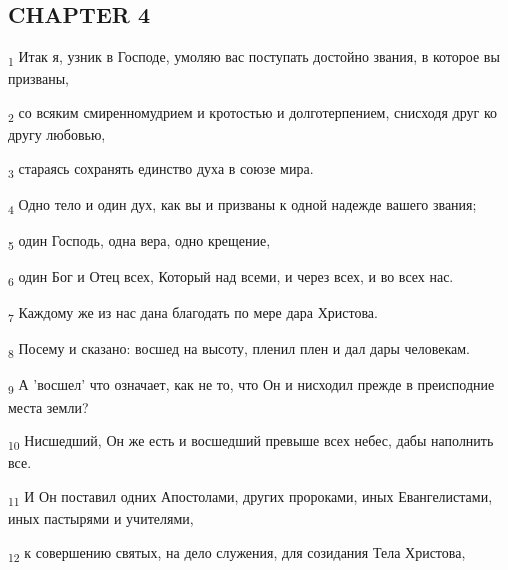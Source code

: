 \subsection{CHAPTER 4}
\begin{tcolorbox}
\textsubscript{1} Итак я, узник в Господе, умоляю вас поступать достойно звания, в которое вы призваны,
\end{tcolorbox}
\begin{tcolorbox}
\textsubscript{2} со всяким смиренномудрием и кротостью и долготерпением, снисходя друг ко другу любовью,
\end{tcolorbox}
\begin{tcolorbox}
\textsubscript{3} стараясь сохранять единство духа в союзе мира.
\end{tcolorbox}
\begin{tcolorbox}
\textsubscript{4} Одно тело и один дух, как вы и призваны к одной надежде вашего звания;
\end{tcolorbox}
\begin{tcolorbox}
\textsubscript{5} один Господь, одна вера, одно крещение,
\end{tcolorbox}
\begin{tcolorbox}
\textsubscript{6} один Бог и Отец всех, Который над всеми, и через всех, и во всех нас.
\end{tcolorbox}
\begin{tcolorbox}
\textsubscript{7} Каждому же из нас дана благодать по мере дара Христова.
\end{tcolorbox}
\begin{tcolorbox}
\textsubscript{8} Посему и сказано: восшед на высоту, пленил плен и дал дары человекам.
\end{tcolorbox}
\begin{tcolorbox}
\textsubscript{9} А 'восшел' что означает, как не то, что Он и нисходил прежде в преисподние места земли?
\end{tcolorbox}
\begin{tcolorbox}
\textsubscript{10} Нисшедший, Он же есть и восшедший превыше всех небес, дабы наполнить все.
\end{tcolorbox}
\begin{tcolorbox}
\textsubscript{11} И Он поставил одних Апостолами, других пророками, иных Евангелистами, иных пастырями и учителями,
\end{tcolorbox}
\begin{tcolorbox}
\textsubscript{12} к совершению святых, на дело служения, для созидания Тела Христова,
\end{tcolorbox}

